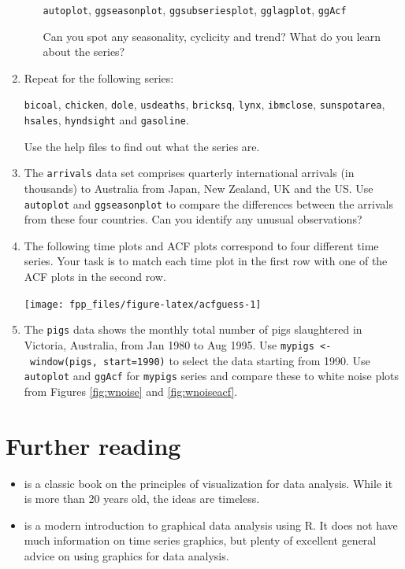 \documentclass[]{book}
\providecommand{\tightlist}{%
  \setlength{\itemsep}{0pt}\setlength{\parskip}{0pt}}
\begin{document}
\begin{enumerate}
\begin{enumerate}
    \texttt{autoplot}, \texttt{ggseasonplot}, \texttt{ggsubseriesplot}, \texttt{gglagplot}, \texttt{ggAcf}

    Can you spot any seasonality, cyclicity and trend? What do you learn about the series?
  \end{enumerate}
\item
  Repeat for the following series:

  \texttt{bicoal}, \texttt{chicken}, \texttt{dole}, \texttt{usdeaths}, \texttt{bricksq}, \texttt{lynx}, \texttt{ibmclose}, \texttt{sunspotarea}, \texttt{hsales}, \texttt{hyndsight} and \texttt{gasoline}.

  Use the help files to find out what the series are.
\item
  The \texttt{arrivals} data set comprises quarterly international arrivals (in thousands) to Australia from Japan, New Zealand, UK and the US. Use \texttt{autoplot} and \texttt{ggseasonplot} to compare the differences between the arrivals from these four countries. Can you identify any unusual observations?
\item
  The following time plots and ACF plots correspond to four different time series. Your task is to match each time plot in the first row with one of the ACF plots in the second row.

  \begin{center}\texttt{[image: fpp\_files/figure-latex/acfguess-1]} \end{center}
\item
  The \texttt{pigs} data shows the monthly total number of pigs slaughtered in Victoria, Australia, from Jan 1980 to Aug 1995. Use \texttt{mypigs\ \textless{}-\ window(pigs,\ start=1990)} to select the data starting from 1990. Use \texttt{autoplot} and \texttt{ggAcf} for \texttt{mypigs} series and compare these to white noise plots from Figures \ref{fig:wnoise} and \ref{fig:wnoiseacf}.
\end{enumerate}

\hypertarget{further-reading-1}{%
\section{Further reading}\label{further-reading-1}}

\begin{itemize}
\tightlist
\item
  \citet{Cleveland1993} is a classic book on the principles of visualization for data analysis. While it is more than 20 years old, the ideas are timeless.
\item
  \citet{Unwin2015} is a modern introduction to graphical data analysis using R. It does not have much information on time series graphics, but plenty of excellent general advice on using graphics for data analysis.
\end{itemize}
\end{document}

